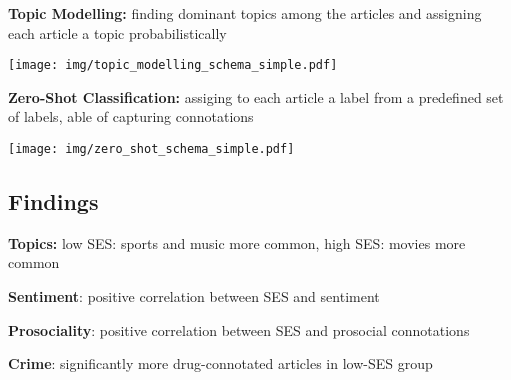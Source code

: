     \vspace{0.2cm}
    \begin{minipage}[t]{0.48\textwidth}
        \textbf{Topic Modelling:} finding dominant topics among the articles and assigning each article a topic probabilistically
        \begin{center}
            \texttt{[image: img/topic\_modelling\_schema\_simple.pdf]}
        \end{center}
    \end{minipage}
    \hspace{0.04\textwidth}
    \begin{minipage}[t]{0.48\textwidth}
        \textbf{Zero-Shot Classification:} assiging to each article a label from a predefined set of labels, able of capturing connotations
        \begin{center}
            \texttt{[image: img/zero\_shot\_schema\_simple.pdf]}
        \end{center}
    \end{minipage}

    \subsection*{Findings}
    \begin{center}
        \begin{minipage}[t]{0.22\textwidth}
            \small{\textbf{Topics:} low SES: sports and music more common, high SES: movies more common}

            \resizebox{!}{\textwidth}{}
        \end{minipage}
        \hspace{0.03\textwidth}
        \begin{minipage}[t]{0.22\textwidth}
            \small{\textbf{Sentiment}: positive correlation between SES and sentiment}

            \resizebox{!}{\textwidth}{}
        \end{minipage}
        \hspace{0.03\textwidth}
        \begin{minipage}[t]{0.22\textwidth}
            \small{\textbf{Prosociality}: positive correlation between SES and prosocial connotations}

            \resizebox{!}{\textwidth}{}
        \end{minipage}
        \hspace{0.03\textwidth}
        \begin{minipage}[t]{0.22\textwidth}
            \small{\textbf{Crime}: significantly more drug-connotated articles in low-SES group}

            \resizebox{!}{\textwidth}{}
        \end{minipage}
    \end{center}

